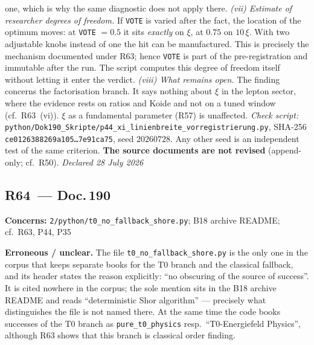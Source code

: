 one, which is why the same diagnostic does not apply there.
\emph{(vii) Estimate of researcher degrees of freedom.} If \texttt{VOTE}
is varied after the fact, the location of the optimum moves: at
\texttt{VOTE} $= 0.5$ it sits \emph{exactly} on $\xi$, at $0.75$ on
$10\,\xi$. With two adjustable knobs instead of one the hit can be
manufactured. This is precisely the mechanism documented under R63; hence
\texttt{VOTE} is part of the pre-registration and immutable after the
run. The script computes this degree of freedom itself without letting it
enter the verdict.
\emph{(viii) What remains open.} The finding concerns the factorisation
branch. It says nothing about $\xi$ in the lepton sector, where the
evidence rests on ratios and Koide and not on a tuned window
(cf.\ R63~(vi)). $\xi$ as a fundamental parameter (R57) is unaffected.
\emph{Check script:}
\texttt{python/\allowbreak Dok190\_\allowbreak Skripte/\allowbreak p44\_\allowbreak xi\_\allowbreak linienbreite\_\allowbreak vorregistrierung.py},
SHA-256 \texttt{ce0126388269a105\ldots{}7e91ca75}, seed $20260728$.
Any other seed is an independent test of the same criterion.
\textbf{The source documents are not revised}
(append-only; cf.\ R50). \emph{Declared 28 July 2026}

\medskip

\subsection*{R64~--- Doc.\,190}

\noindent\textbf{Concerns:} \texttt{2/python/t0\_no\_fallback\_shore.py};
B18 archive README; cf.\ R63, P44, P35

\smallskip\noindent\textbf{Erroneous / unclear.}\quad
The file \texttt{t0\_no\_fallback\_shore.py} is the only one in the corpus
that keeps separate books for the T0 branch and the classical fallback,
and its header states the reason explicitly: \enquote{no obscuring of the
source of success}. It is cited nowhere in the corpus; the sole mention
sits in the B18 archive README and reads \enquote{deterministic Shor
algorithm} --- precisely what distinguishes the file is not named there.
At the same time the code books successes of the T0 branch as
\texttt{pure\_t0\_physics} resp.\ \enquote{T0-Energiefeld Physics},
although R63 shows that this branch is classical order finding.

